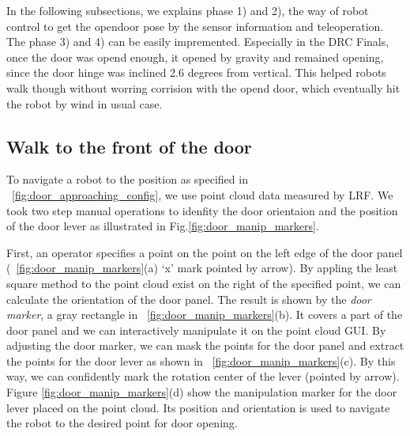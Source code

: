 

In the following subsections, we explains phase 1) and 2), the way of robot control to get the opendoor pose
by the sensor information and teleoperation. The phase 3) and 4) can be easily impremented. 
Especially in the DRC Finals, once the door was opend enough, it opened by gravity
and remained opening, since the door hinge was inclined 2.6 degrees from vertical.
This helped robots walk though without worring corrision with the opend door, which eventually hit the
robot by wind in usual case. 

\subsection{Walk to the front of the door}
%
To navigate a robot to the position as specified in \figurename~\ref{fig:door_approaching_config}, we use
point cloud data measured by LRF. 
We took two step manual operations to idenfity the door orientaion and the position of the door lever 
as illustrated in Fig.\ref{fig:door_manip_markers}.

First, an operator specifies a point on the point on the left edge of the door panel (\figurename~\ref{fig:door_manip_markers}(a) `x' mark pointed by arrow). By appling the least square method to the point cloud exist on the right of the specified point, we can calculate the orientation of the door panel.
The result is shown by the {\it door marker}, a gray rectangle in \figurename~\ref{fig:door_manip_markers}(b).
It covers a part of the door panel and we can interactively manipulate it on the 
point cloud GUI. By adjusting the door marker, we can mask the points for the door panel and extract the points for the door lever as shown in \figurename~\ref{fig:door_manip_markers}(c).
By this way, we can confidently mark the rotation center of the lever (pointed by arrow).
Figure \ref{fig:door_manip_markers}(d) show the manipulation marker for the door lever placed on the point cloud. Its position and orientation is used to navigate the robot to the desired point for door opening.

